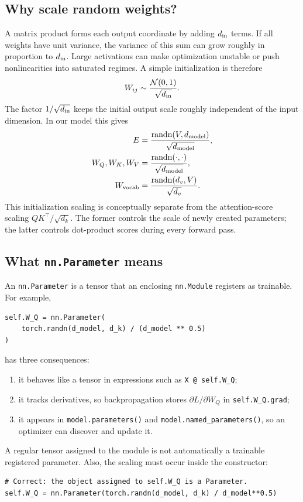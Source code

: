 \documentclass[11pt]{article}
\begin{document}
\subsection{Why scale random weights?}

A matrix product forms each output coordinate by adding $d_{\rm in}$ terms. If all weights have unit variance,
the variance of this sum can grow roughly in proportion to $d_{\rm in}$. Large activations can make optimization
unstable or push nonlinearities into saturated regimes. A simple initialization is therefore
\[
  W_{ij}\sim\frac{\mathcal N(0,1)}{\sqrt{d_{\rm in}}}.
\]
The factor $1/\sqrt{d_{\rm in}}$ keeps the initial output scale roughly independent of the input dimension.
In our model this gives
\begin{align*}
 E&=\frac{\operatorname{randn}(V,d_{\rm model})}{\sqrt{d_{\rm model}}},\\
 W_Q,W_K,W_V&=\frac{\operatorname{randn}(\cdot,\cdot)}{\sqrt{d_{\rm model}}},\\
 W_{\rm vocab}&=\frac{\operatorname{randn}(d_v,V)}{\sqrt{d_v}}.
\end{align*}
This initialization scaling is conceptually separate from the attention-score scaling
$QK^\top/\sqrt{d_k}$. The former controls the scale of newly created parameters; the latter controls dot-product
scores during every forward pass.

\subsection{What \texttt{nn.Parameter} means}

An \texttt{nn.Parameter} is a tensor that an enclosing \texttt{nn.Module} registers as trainable. For example,
\begin{lstlisting}
self.W_Q = nn.Parameter(
    torch.randn(d_model, d_k) / (d_model ** 0.5)
)
\end{lstlisting}
has three consequences:
\begin{enumerate}
  \item it behaves like a tensor in expressions such as \texttt{X @ self.W\_Q};
  \item it tracks derivatives, so backpropagation stores $\partial L/\partial W_Q$ in
  \texttt{self.W\_Q.grad};
  \item it appears in \texttt{model.parameters()} and \texttt{model.named\_parameters()}, so an optimizer can
  discover and update it.
\end{enumerate}
A regular tensor assigned to the module is not automatically a trainable registered parameter. Also, the
scaling must occur inside the constructor:
\begin{lstlisting}
# Correct: the object assigned to self.W_Q is a Parameter.
self.W_Q = nn.Parameter(torch.randn(d_model, d_k) / d_model**0.5)
\end{lstlisting}
\end{document}
